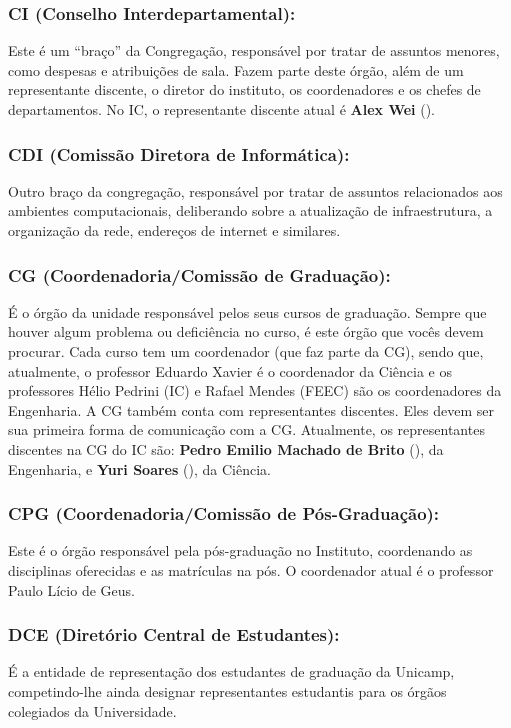 \subsubsection{CI (Conselho Interdepartamental):} Este é um ``braço'' da
Congregação, responsável por tratar de assuntos menores, como despesas e
atribuições de sala. Fazem parte deste órgão, além de um representante discente,
o diretor do instituto, os coordenadores e os chefes de departamentos. No IC, o
representante discente atual é \textbf{Alex Wei} ().

\subsubsection{CDI (Comissão Diretora de Informática):} Outro braço da
congregação, responsável por tratar de assuntos relacionados aos ambientes
computacionais, deliberando sobre a atualização de infraestrutura, a organização
da rede, endereços de internet e similares.

\subsubsection{CG (Coordenadoria/Comissão de Graduação):} É o órgão da unidade
responsável pelos seus cursos de graduação. Sempre que houver algum problema ou
deficiência no curso, é este órgão que vocês devem procurar.  Cada curso tem um
coordenador (que faz parte da CG), sendo que, atualmente, o professor Eduardo
Xavier é o coordenador da Ciência e os professores Hélio Pedrini (IC) e Rafael
Mendes (FEEC) são os coordenadores da Engenharia. A CG também conta com
representantes discentes. Eles devem ser sua primeira forma de comunicação com a
CG.  Atualmente, os representantes discentes na CG do IC são: \textbf{Pedro
Emilio Machado de Brito} (), da Engenharia, e
\textbf{Yuri Soares} (), da Ciência.

\subsubsection{CPG (Coordenadoria/Comissão de Pós-Graduação):} Este é o órgão
responsável pela pós-graduação no Instituto, coordenando as disciplinas
oferecidas e as matrículas na pós. O coordenador atual é o professor Paulo Lício
de Geus.

\subsubsection{DCE (Diretório Central de Estudantes):} É a entidade de
representação dos estudantes de graduação da Unicamp, competindo-lhe ainda
designar representantes estudantis para os órgãos colegiados da Universidade.

